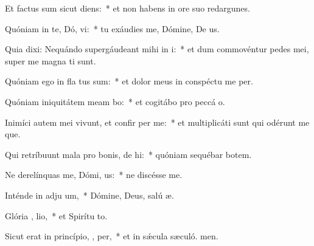 \item Et factus sum sicut   diens:~* et non habens in ore suo redargunes.
\item Quóniam in te, Dó, vi:~* tu exáudies me, Dómine, De us.
\item Quia dixi: Nequándo supergáudeant mihi in i:~* et dum commovéntur pedes mei, super me magna ti sunt.
\item Quóniam ego in fla tus sum:~* et dolor meus in conspéctu me per.
\item Quóniam iniquitátem meam bo:~* et cogitábo pro peccá o.
\item Inimíci autem mei vivunt, et confir  per me:~* et multiplicáti sunt qui odérunt me que.
\item Qui retríbuunt mala pro bonis, de hi:~* quóniam sequébar botem.
\item Ne derelínquas me, Dómi,  us:~* ne discésse  me.
\item Inténde in adju um,~* Dómine, Deus, salú æ.
\item Glória ,  lio,~* et Spirítu to.
\item Sicut erat in princípio,  ,  per,~* et in sǽcula sæculó. men.
